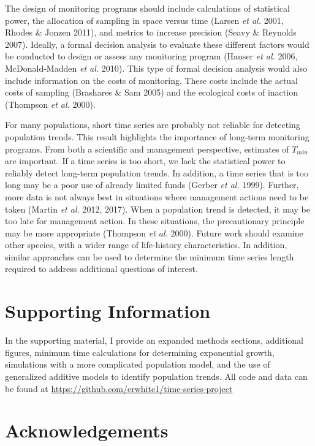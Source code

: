 \documentclass[12pt,]{article}
\begin{document}
The design of monitoring programs should include calculations of
statistical power, the allocation of sampling in space versus time
(Larsen \emph{et al.} 2001, Rhodes \& Jonzen 2011), and metrics to
increase precision (Seavy \& Reynolds 2007). Ideally, a formal decision
analysis to evaluate these different factors would be conducted to
design or assess any monitoring program (Hauser \emph{et al.} 2006,
McDonald-Madden \emph{et al.} 2010). This type of formal decision
analysis would also include information on the costs of monitoring.
These costs include the actual costs of sampling (Brashares \& Sam 2005)
and the ecological costs of inaction (Thompson \emph{et al.} 2000).

For many populations, short time series are probably not reliable for
detecting population trends. This result highlights the importance of
long-term monitoring programs. From both a scientific and management
perspective, estimates of \(T_{min}\) are important. If a time series is
too short, we lack the statistical power to reliably detect long-term
population trends. In addition, a time series that is too long may be a
poor use of already limited funds (Gerber \emph{et al.} 1999). Further,
more data is not always best in situations where management actions need
to be taken (Martin \emph{et al.} 2012, 2017). When a population trend
is detected, it may be too late for management action. In these
situations, the precautionary principle may be more appropriate
(Thompson \emph{et al.} 2000). Future work should examine other species,
with a wider range of life-history characteristics. In addition, similar
approaches can be used to determine the minimum time series length
required to address additional questions of interest.

\section{Supporting Information}\label{supporting-information}

In the supporting material, I provide an expanded methods sections,
additional figures, minimum time calculations for determining
exponential growth, simulations with a more complicated population
model, and the use of generalized additive models to identify population
trends. All code and data can be found at
\url{https://github.com/erwhite1/time-series-project}

\section{Acknowledgements}\label{acknowledgements}
\end{document}
